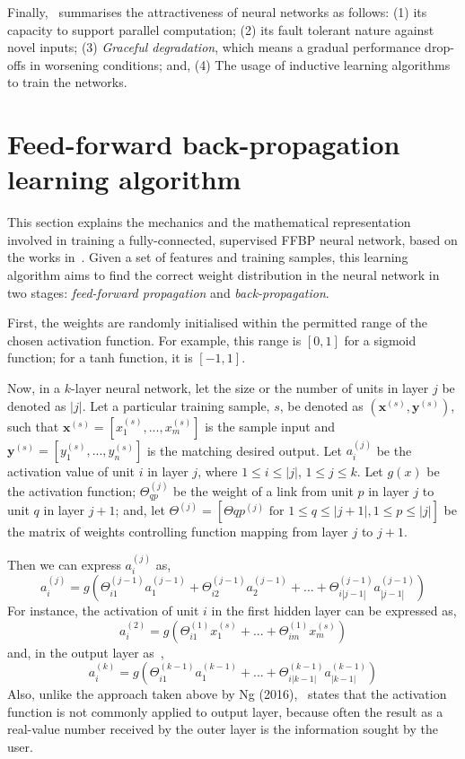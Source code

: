 Finally,~\cite{Nor14} summarises the attractiveness of neural networks as follows: (1) its capacity to support parallel computation; (2) its fault tolerant nature against novel inputs; (3) \textit{Graceful degradation}, which means a gradual performance drop-offs in worsening conditions; and, (4) The usage of inductive learning algorithms to train the networks.

\section{Feed-forward back-propagation learning algorithm}\label{sec:training}

This section explains the mechanics and the mathematical representation involved in training a fully-connected, supervised FFBP neural network, based on the works in~\cite{Ng12}. Given a set of features and training samples, this learning algorithm aims to find the correct weight distribution in the neural network in two stages: \textit{feed-forward propagation} and \textit{back-propagation}. 

First, the weights are randomly initialised within the permitted range of the chosen activation function. For example, this range is $[0,1]$ for a sigmoid function; for a tanh function, it is $[-1,1]$. 

Now, in a $k$-layer neural network, let the size or the number of units in layer $j$ be denoted as $|j|$. Let a particular training sample, $s$, be denoted as $(\boldsymbol{x}^{(s)},\boldsymbol{y}^{(s)})$, such that $\boldsymbol{x}^{(s)} = [x_1^{(s)},...,x_m^{(s)}]$ is the sample input and $\boldsymbol{y}^{(s)} = [y_1^{(s)},...,y_n^{(s)}]$ is the matching desired output. Let $a_{i}^{(j)}$ be the activation value of unit $i$ in layer $j$, where $1 \leq i \leq |j|$, $1 \leq j \leq k$. Let $g(x)$ be the activation function; $\Theta_{qp}^{(j)}$ be the weight of a link from unit $p$ in layer $j$ to unit $q$ in layer $j+1$; and, let $\Theta^{(j)}=[\Theta{qp}^{(j)} \text{ for } 1\leq q \leq |j+1|, 1 \leq p \leq |j|]$ be the matrix of weights controlling function mapping from layer $j$ to $j+1$.

Then we can express $a_{i}^{(j)}$ as,
\begin{equation}
a_{i}^{(j)} = g( \Theta_{i1}^{(j-1)}a_{1}^{(j-1)} + \Theta_{i2}^{(j-1)}a_{2}^{(j-1)} + ...+\Theta_{i|j-1|}^{(j-1)}a_{|j-1|}^{(j-1)} ) \label{eq:2.1}
\end{equation}
For instance, the activation of unit $i$ in the first hidden layer can be expressed as,
$$a_{i}^{(2)} = g(\Theta_{i1}^{(1)}x_{1}^{(s)} + ... + \Theta_{im}^{(1)}x_{m}^{(s)})$$
and, in the output layer as~\cite{Ng12},
$$a_{i}^{(k)} = g(\Theta_{i1}^{(k-1)}a_{1}^{(k-1)} + ...+\Theta_{i|k-1|}^{(k-1)}a_{|k-1|}^{(k-1)})$$ 
Also, unlike the approach taken above by Ng (2016),~\cite{Kar16} states that the activation function is not commonly applied to output layer, because often the result as a real-value number received by the outer layer is the information sought by the user.

